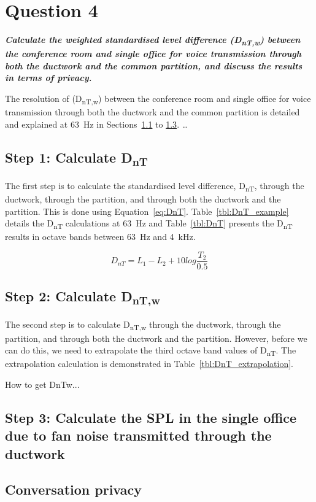 \section{Question 4}

\textbf{\textit{Calculate the weighted standardised level difference (D\textsubscript{nT,w}) between the conference room and single office for voice transmission through both the ductwork and the common partition, and discuss the results in terms of privacy.}}


The resolution of (D\textsubscript{nT,w}) between the conference room and single office for voice transmission through both the ductwork and the common partition is detailed and explained at 63~Hz in Sections~\ref{sec:4.1} to \ref{sec:4.3}.
\ldots


\subsection{Step 1: Calculate D\textsubscript{nT}} \label{sec:4.1}

The first step is to calculate the standardised level difference, D\textsubscript{nT}, through the ductwork, through the partition, and through both the ductwork and the partition.
This is done using Equation~\ref{eq:DnT}.
Table~\ref{tbl:DnT_example} details the D\textsubscript{nT} calculations at 63~Hz and Table~\ref{tbl:DnT} presents the D\textsubscript{nT} results in octave bands between 63~Hz and 4~kHz.

	\begin{equation}\label{eq:DnT}
		D_{nT} = L_1 - L_2 + 10 log \frac{T_2}{0.5}
	\end{equation}






\subsection{Step 2: Calculate D\textsubscript{nT,w}} \label{sec:4.2}

The second step is to calculate D\textsubscript{nT,w} through the ductwork, through the partition, and through both the ductwork and the partition.
However, before we can do this, we need to extrapolate the third octave band values of D\textsubscript{nT}.
The extrapolation calculation is demonstrated in Table~\ref{tbl:DnT_extrapolation}.

How to get DnTw...


	







\subsection{Step 3: Calculate the SPL in the single office due to fan noise transmitted through the ductwork} \label{sec:4.3}



\subsection{Conversation privacy} \label{sec:4.4}

